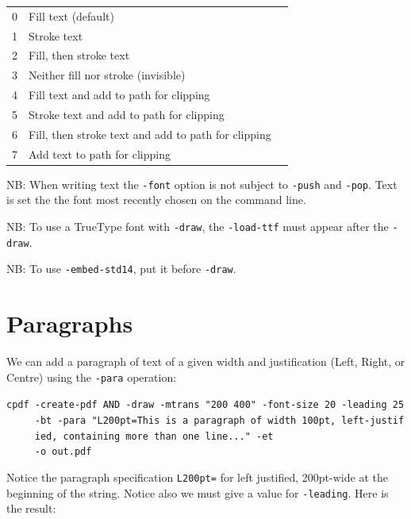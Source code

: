 \documentclass{book}
\begin{document}
\bigskip
\begin{tabular}{lll}
  0&Fill text (default)&\\
  1&Stroke text&\\
  2&Fill, then stroke text&\\
  3&Neither fill nor stroke (invisible)&\\
  4&Fill text and add to path for clipping&\\
  5&Stroke text and add to path for clipping&\\
  6&Fill, then stroke text and add to path for clipping&\\
  7&Add text to path for clipping&
\end{tabular}
\bigskip

NB: When writing text the \texttt{-font} option is not subject to \texttt{-push} and \texttt{-pop}. Text is set the the font most recently chosen on the command line.

NB: To use a TrueType font with \texttt{-draw}, the \texttt{-load-ttf} must appear after the \texttt{-draw}.

NB: To use \texttt{-embed-std14}, put it before \texttt{-draw}.

\section{Paragraphs}

We can add a paragraph of text of a given width and justification (Left, Right, or Centre) using the \texttt{-para} operation:

\begin{framed}
 \noindent\small\verb?cpdf -create-pdf AND -draw -mtrans "200 400" -font-size 20 -leading 25?\\
 \noindent\small\verb?     -bt -para "L200pt=This is a paragraph of width 100pt, left-justif?\\
 \noindent\small\verb?     ied, containing more than one line..." -et?\\
 \noindent\small\verb?     -o out.pdf?
\end{framed}

\noindent Notice the paragraph specification \texttt{L200pt=} for left justified, 200pt-wide at the beginning of the string. Notice also we must give a value for \texttt{-leading}. Here is the result:
\end{document}
